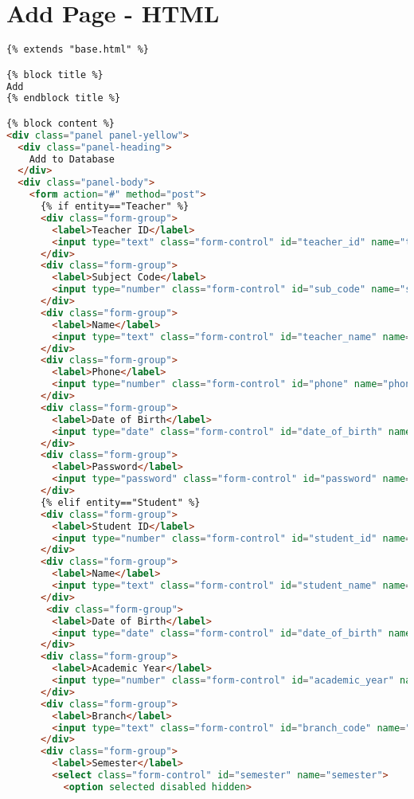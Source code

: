 \section{Add Page - HTML}
\begin{lstlisting}[language=HTML]
{% extends "base.html" %}

{% block title %}
Add
{% endblock title %}

{% block content %}
<div class="panel panel-yellow">
  <div class="panel-heading">
    Add to Database
  </div>
  <div class="panel-body">
    <form action="#" method="post">
      {% if entity=="Teacher" %}
      <div class="form-group">
        <label>Teacher ID</label>
        <input type="text" class="form-control" id="teacher_id" name="teacher_id">
      </div>
      <div class="form-group">
        <label>Subject Code</label>
        <input type="number" class="form-control" id="sub_code" name="sub_code">
      </div>
      <div class="form-group">
        <label>Name</label>
        <input type="text" class="form-control" id="teacher_name" name="teacher_name">
      </div>
      <div class="form-group">
        <label>Phone</label>
        <input type="number" class="form-control" id="phone" name="phone">
      </div>
      <div class="form-group">
        <label>Date of Birth</label>
        <input type="date" class="form-control" id="date_of_birth" name="date_of_birth">
      </div>
      <div class="form-group">
        <label>Password</label>
        <input type="password" class="form-control" id="password" name="password">
      </div>
      {% elif entity=="Student" %}
      <div class="form-group">
        <label>Student ID</label>
        <input type="number" class="form-control" id="student_id" name="student_id">
      </div>
      <div class="form-group">
        <label>Name</label>
        <input type="text" class="form-control" id="student_name" name="student_name">
      </div>
       <div class="form-group">
        <label>Date of Birth</label>
        <input type="date" class="form-control" id="date_of_birth" name="date_of_birth">
      </div>
      <div class="form-group">
        <label>Academic Year</label>
        <input type="number" class="form-control" id="academic_year" name="academic_year">
      </div>
      <div class="form-group">
        <label>Branch</label>
        <input type="text" class="form-control" id="branch_code" name="branch_code">
      </div>
      <div class="form-group">
        <label>Semester</label>
        <select class="form-control" id="semester" name="semester">
          <option selected disabled hidden>

\end{lstlisting}
